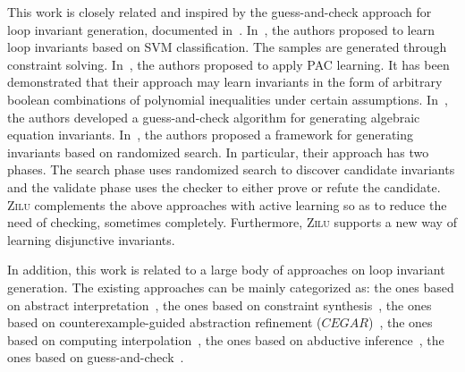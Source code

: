 This work is closely related and inspired by the guess-and-check approach for loop invariant generation, documented in~\cite{sharma2012interpolants,sharma2013verification,DBLP:conf/esop/0001GHALN13,sharma2014invariant}.
In~\cite{sharma2012interpolants}, the authors proposed to learn loop invariants based on SVM classification.
The samples are generated through constraint solving. In~\cite{sharma2013verification}, the authors proposed to apply PAC learning.
It has been demonstrated that their approach may learn invariants in the form of arbitrary boolean
combinations of polynomial inequalities under certain assumptions. In~\cite{DBLP:conf/esop/0001GHALN13},
the authors developed a guess-and-check algorithm for generating algebraic equation invariants.
In~\cite{sharma2014invariant}, the authors proposed a framework for generating invariants based on randomized search.
In particular, their approach has two phases. The search phase uses randomized search to discover candidate invariants and the validate phase uses the checker to either prove or refute the candidate.
\textsc{Zilu} complements the above approaches with active learning so as to reduce the need of checking, sometimes completely. Furthermore, \textsc{Zilu} supports a new way of learning disjunctive invariants.

In addition, this work is related to a large body of approaches on loop invariant generation. The existing approaches can be mainly categorized as:
the ones based on abstract interpretation~\cite{cousot1978automatic,mine2006octagon,karr1976affine,vincent2009subpolyhedra}, %
the ones based on constraint synthesis~\cite{ashutosh2009invgen,michael2003linear,sumit2009constraint},
the ones based on counterexample-guided abstraction refinement ($\mathit{CEGAR}$)~\cite{henzinger2003software,thomas2001slam,edmund2003counterexample},
the ones based on computing interpolation~\cite{thomas2004abstractions,kenneth2003interpolation,Kenneth2006lazy},
the ones based on abductive inference~\cite{isil2013inductive},
the ones based on guess-and-check~\cite{cormac2001houdini,ernst2007daikon}.

